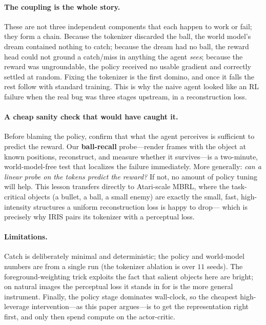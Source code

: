 \documentclass[11pt]{article}
\newcommand{\nseeds}{11}
\begin{document}
\paragraph{The coupling is the whole story.} These are not three independent
components that each happen to work or fail; they form a chain. Because the
tokenizer discarded the ball, the world model's dream contained nothing to catch;
because the dream had no ball, the reward head could not ground a catch/miss in
anything the agent \emph{sees}; because the reward was ungroundable, the policy
received no usable gradient and correctly settled at random. Fixing the tokenizer
is the first domino, and once it falls the rest follow with standard training.
This is why the naive agent looked like an RL failure when the real bug was three
stages upstream, in a reconstruction loss.

\paragraph{A cheap sanity check that would have caught it.} Before blaming the
policy, confirm that what the agent perceives is sufficient to predict the reward.
Our \textbf{ball-recall} probe---render frames with the object at known positions,
reconstruct, and measure whether it survives---is a two-minute, world-model-free
test that localizes the failure immediately. More generally: \emph{can a linear
probe on the tokens predict the reward?} If not, no amount of policy tuning will
help. This lesson transfers directly to Atari-scale MBRL, where the
task-critical objects (a bullet, a ball, a small enemy) are exactly the small,
fast, high-intensity structures a uniform reconstruction loss is happy to drop---
which is precisely why IRIS pairs its tokenizer with a perceptual loss.

\paragraph{Limitations.} Catch is deliberately minimal and deterministic; the
policy and world-model numbers are from a single run (the tokenizer ablation is
over $\nseeds$ seeds). The foreground-weighting trick exploits the fact that
salient objects here are bright; on natural images the perceptual loss it stands
in for is the more general instrument. Finally, the policy stage dominates
wall-clock, so the cheapest high-leverage intervention---as this paper
argues---is to get the representation right first, and only then spend compute on
the actor-critic.
\end{document}
